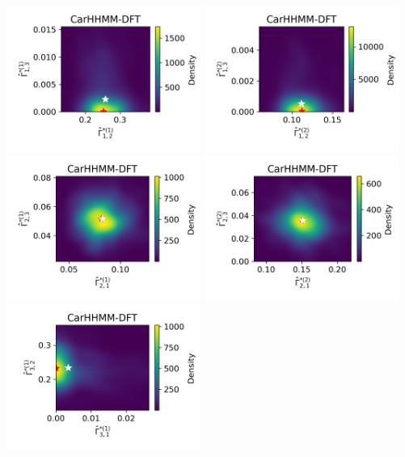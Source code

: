 \documentclass{article}
\begin{document}
\begin{center}
        \includegraphics[width=2.5in]{../Plots/hhmm_FV_Gamma_density_0_row_0.png}
        \includegraphics[width=2.5in]{../Plots/hhmm_FV_Gamma_density_1_row_0.png}
        \includegraphics[width=2.5in]{../Plots/hhmm_FV_Gamma_density_0_row_1.png}
        \includegraphics[width=2.5in]{../Plots/hhmm_FV_Gamma_density_1_row_1.png}
        \includegraphics[width=2.5in]{../Plots/hhmm_FV_Gamma_density_0_row_2.png}

\end{center}
\end{document}
